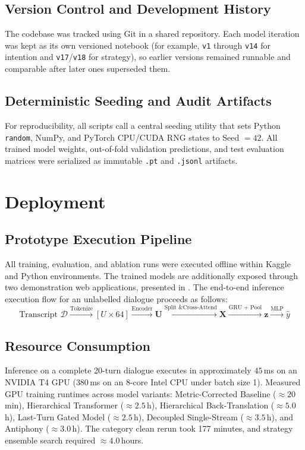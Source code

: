 \subsection{Version Control and Development History}
The codebase was tracked using Git \cite{git} in a shared repository. Each model iteration was kept as its own versioned notebook (for example, \texttt{v1} through \texttt{v14} for intention and \texttt{v17}/\texttt{v18} for strategy), so earlier versions remained runnable and comparable after later ones superseded them.

\subsection{Deterministic Seeding and Audit Artifacts}
For reproducibility, all scripts call a central seeding utility that sets Python \texttt{random}, NumPy, and PyTorch CPU/CUDA RNG states to Seed $= 42$. All trained model weights, out-of-fold validation predictions, and test evaluation matrices were serialized as immutable \texttt{.pt} and \texttt{.jsonl} artifacts.

\section{Deployment}
\label{sec:deployment}

\subsection{Prototype Execution Pipeline}
All training, evaluation, and ablation runs were executed offline within Kaggle and Python environments. The trained models are additionally exposed through two demonstration web applications, presented in . The end-to-end inference execution flow for an unlabelled dialogue proceeds as follows:
\begin{equation}
  \text{Transcript } \mathcal{D} \xrightarrow{\text{Tokenize}} [U \times 64] \xrightarrow{\text{Encoder}} \mathbf{U} \xrightarrow{\text{Split \& Cross-Attend}} \mathbf{X} \xrightarrow{\text{GRU + Pool}} \mathbf{z} \xrightarrow{\text{MLP}} \hat{y}
\end{equation}

\subsection{Resource Consumption}
Inference on a complete 20-turn dialogue executes in approximately $45$\,ms on an NVIDIA T4 GPU ($380$\,ms on an 8-core Intel CPU under batch size 1). Measured GPU training runtimes across model variants: Metric-Corrected Baseline ($\approx 20$\,min), Hierarchical Transformer ($\approx 2.5$\,h), Hierarchical Back-Translation ($\approx 5.0$\,h), Last-Turn Gated Model ($\approx 2.5$\,h), Decoupled Single-Stream ($\approx 3.5$\,h), and Antiphony ($\approx 3.0$\,h). The category clean rerun took 177 minutes, and strategy ensemble search required $\approx 4.0$\,hours.

